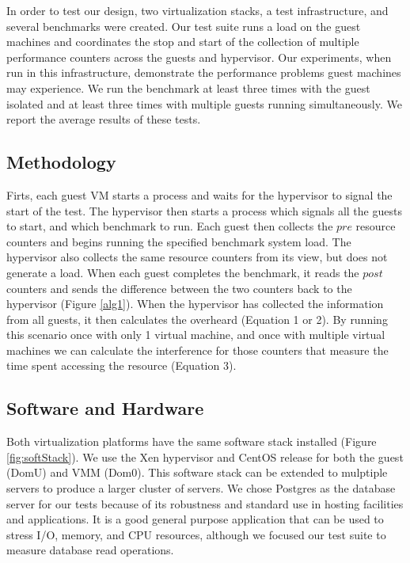 In order to test our design, two virtualization stacks, a test infrastructure, and several benchmarks were created.  Our test suite runs a load on the guest machines and coordinates the stop and start of the collection of multiple performance counters across the guests and hypervisor.     
Our experiments, when run in this infrastructure, demonstrate the performance problems guest machines may experience.  We run the benchmark at least three times with the guest isolated and at least three times with multiple guests running simultaneously.  We report the average results of these tests.

\subsection{Methodology}
Firts, each guest VM starts a process and waits for the hypervisor to signal the start of the test.  
The hypervisor then starts a process which signals all the guests to start, and which benchmark to run.  
Each guest then collects the $pre$ resource counters and begins running the specified benchmark system load.  
The hypervisor also collects the same resource counters from its view, but does not generate a load.  
When each guest completes the benchmark, it reads the $post$ counters and sends the difference between the two counters back to the hypervisor (Figure \ref{alg1}).
When the hypervisor has collected the information from all guests, it then calculates the overheard (Equation 1 or 2).
By running this scenario once with only 1 virtual machine, and once with multiple virtual machines we can calculate the interference for those counters that measure the time spent accessing the resource (Equation 3).

\subsection{Software and Hardware}
\indent Both virtualization platforms have the same software stack installed (Figure \ref{fig:softStack}).  
We use the Xen hypervisor and CentOS release for both the guest (DomU) and VMM (Dom0).  
This software stack can be extended to mulptiple servers to produce a larger cluster of servers.  
We chose Postgres as the database server for our tests because of its robustness and standard use in hosting facilities and applications.  
It is a good general purpose application that can be used to stress I/O, memory, and CPU resources, although we focused our test suite to measure database read operations.

